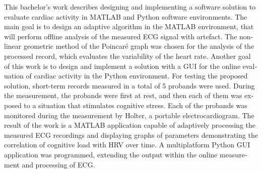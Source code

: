 \begin{otherlanguage}{english}
This bachelor's work describes designing and implementing a software
solution to evaluate cardiac activity in MATLAB and Python
software environments. The main goal is to design an adaptive algorithm in the
MATLAB environment, that will perform offline analysis of the
measured ECG signal with artefact. The nonlinear geometric method of the
Poincaré graph was chosen for the analysis of the processed record, which
evaluates the variability of the heart rate. Another goal of this work is to
design and implement a solution with a GUI for the online evaluation of cardiac
activity in the Python environment. For testing the proposed solution,
short-term records measured in a total of 5 probands were used. During the
measurement, the probands were first at rest, and then each of them was exposed
to a situation that stimulates cognitive stress. Each of the probands was
monitored during the measurement by Holter, a portable electrocardiogram. The
result of the work is a MATLAB application capable of adaptively processing the
measured ECG recordings and displaying graphs of parameters demonstrating the
correlation of cognitive load with HRV over time. A
multiplatform Python GUI application was programmed, extending the output within
the online measurement and processing of ECG. 
\end{otherlanguage}